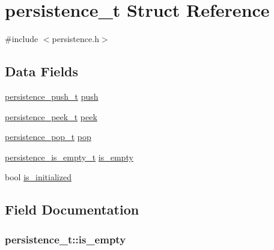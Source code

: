 \hypertarget{structpersistence__t}{}\section{persistence\+\_\+t Struct Reference}
\label{structpersistence__t}


{\ttfamily \#include $<$persistence.\+h$>$}

\subsection*{Data Fields}
\begin{DoxyCompactItemize}
\item 
\hyperlink{persistence_8h_a7543ef4dbe6bd99c90951a9283d53c96}{persistence\+\_\+push\+\_\+t} \hyperlink{structpersistence__t_a2758707766bb59cf775f4009d179a742}{push}
\item 
\hyperlink{persistence_8h_a72b6e8035474c47c1fe02bd032015c57}{persistence\+\_\+peek\+\_\+t} \hyperlink{structpersistence__t_acbe305a2910b27cfb7c8b86371803b31}{peek}
\item 
\hyperlink{persistence_8h_a7a0e08be12607e823180cdc34226f399}{persistence\+\_\+pop\+\_\+t} \hyperlink{structpersistence__t_a557d32f781ef1250fd881db11d20a80d}{pop}
\item 
\hyperlink{persistence_8h_a1c7eb950f361106f1a9d1e802d2da115}{persistence\+\_\+is\+\_\+empty\+\_\+t} \hyperlink{structpersistence__t_ad97b1cd5318317fdd82c53da95afb5bf}{is\+\_\+empty}
\item 
bool \hyperlink{structpersistence__t_a4cf5a90e3ddbcc0f506700e150ad36b2}{is\+\_\+initialized}
\end{DoxyCompactItemize}


\subsection{Field Documentation}
\subsubsection[{\texorpdfstring{is\+\_\+empty}{is_empty}}]{ persistence\+\_\+t\+::is\+\_\+empty}\hypertarget{structpersistence__t_ad97b1cd5318317fdd82c53da95afb5bf}{}\label{structpersistence__t_ad97b1cd5318317fdd82c53da95afb5bf}
